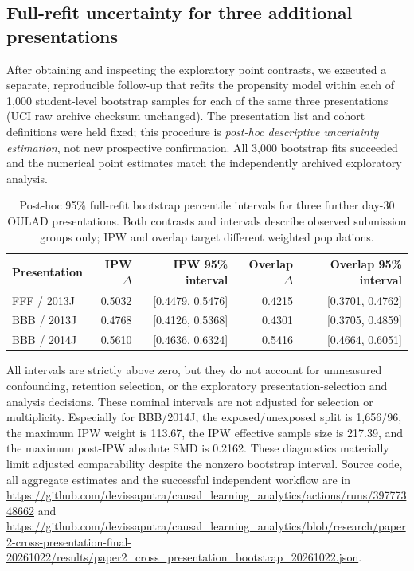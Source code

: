 \documentclass[10pt,a4paper]{article}
\begin{document}
\subsection{Full-refit uncertainty for three additional presentations}
After obtaining and inspecting the exploratory point contrasts, we executed a separate, reproducible follow-up that refits the propensity model within each of 1,000 student-level bootstrap samples for each of the same three presentations (UCI raw archive checksum unchanged). The presentation list and cohort definitions were held fixed; this procedure is \emph{post-hoc descriptive uncertainty estimation}, not new prospective confirmation. All 3,000 bootstrap fits succeeded and the numerical point estimates match the independently archived exploratory analysis.
\begin{table}[ht]\centering\small
\caption{Post-hoc 95\% full-refit bootstrap percentile intervals for three further day-30 OULAD presentations. Both contrasts and intervals describe observed submission groups only; IPW and overlap target different weighted populations.}
\label{tab:crossci}
\begin{tabular}{lrrrr}\toprule
Presentation & IPW $\Delta$ & IPW 95\% interval & Overlap $\Delta$ & Overlap 95\% interval\\\midrule
FFF / 2013J & 0.5032 & [0.4479, 0.5476] & 0.4215 & [0.3701, 0.4762]\\
BBB / 2013J & 0.4768 & [0.4126, 0.5368] & 0.4301 & [0.3705, 0.4859]\\
BBB / 2014J & 0.5610 & [0.4636, 0.6324] & 0.5416 & [0.4664, 0.6051]\\\bottomrule
\end{tabular}\end{table}
All intervals are strictly above zero, but they do not account for unmeasured confounding, retention selection, or the exploratory presentation-selection and analysis decisions. These nominal intervals are not adjusted for selection or multiplicity. Especially for BBB/2014J, the exposed/unexposed split is 1,656/96, the maximum IPW weight is 113.67, the IPW effective sample size is 217.39, and the maximum post-IPW absolute SMD is 0.2162. These diagnostics materially limit adjusted comparability despite the nonzero bootstrap interval. Source code, all aggregate estimates and the successful independent workflow are in \url{https://github.com/devissaputra/causal_learning_analytics/actions/runs/39777348662} and \url{https://github.com/devissaputra/causal_learning_analytics/blob/research/paper2-cross-presentation-final-20261022/results/paper2_cross_presentation_bootstrap_20261022.json}.
\end{document}
